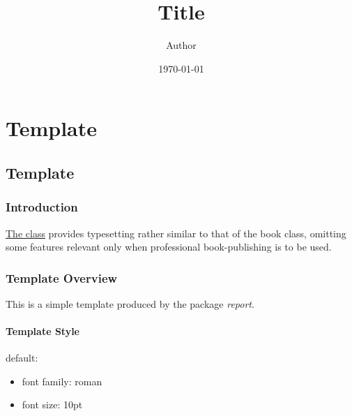\documentclass{report}
\title{Title}
\author{Author}
\date{\today}
\providecommand{\tightlist}{
\setlength{\itemsep}{0pt}\setlength{\parskip}{0pt}}
\begin{document}
\maketitle
\tableofcontents
\newpage
\part{Template}
\chapter{Template}
\section{Introduction}
{
\href{https://ctan.org/pkg/report}{The class} provides typesetting rather similar to that of the book class, omitting some features relevant only when professional book-publishing is to be used.
}
\section{Template Overview}
{
This is a simple template produced by the package \textit{report}.
}
\subsection{Template Style}
{
default:

\begin{itemize}
\tightlist
\item
font family: roman
\item
font size: 10pt
\end{itemize}
}
\end{document}
